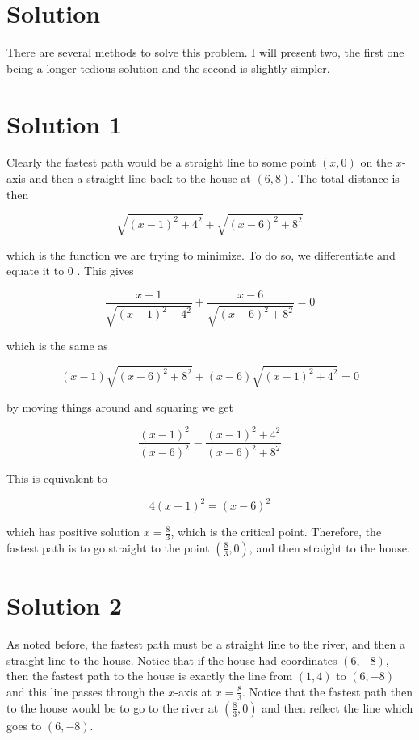 \documentclass[10pt]{article}
\begin{document}
\section*{Solution}
There are several methods to solve this problem. I will present two, the first one being a longer tedious solution and the second is slightly simpler.

\section*{Solution 1}
Clearly the fastest path would be a straight line to some point $(x, 0)$ on the $x$-axis and then a straight line back to the house at $(6,8)$. The total distance is then

$$
\sqrt{(x-1)^{2}+4^{2}}+\sqrt{(x-6)^{2}+8^{2}}
$$

which is the function we are trying to minimize. To do so, we differentiate and equate it to 0 . This gives

$$
\frac{x-1}{\sqrt{(x-1)^{2}+4^{2}}}+\frac{x-6}{\sqrt{(x-6)^{2}+8^{2}}}=0
$$

which is the same as

$$
(x-1) \sqrt{(x-6)^{2}+8^{2}}+(x-6) \sqrt{(x-1)^{2}+4^{2}}=0
$$

by moving things around and squaring we get

$$
\frac{(x-1)^{2}}{(x-6)^{2}}=\frac{(x-1)^{2}+4^{2}}{(x-6)^{2}+8^{2}}
$$

This is equivalent to

$$
4(x-1)^{2}=(x-6)^{2}
$$

which has positive solution $x=\frac{8}{3}$, which is the critical point. Therefore, the fastest path is to go straight to the point $\left(\frac{8}{3}, 0\right)$, and then straight to the house.

\section*{Solution 2}
As noted before, the fastest path must be a straight line to the river, and then a straight line to the house. Notice that if the house had coordinates $(6,-8)$, then the fastest path to the house is exactly the line from $(1,4)$ to $(6,-8)$ and this line passes through the $x$-axis at $x=\frac{8}{3}$. Notice that the fastest path then to the house would be to go to the river at $\left(\frac{8}{3}, 0\right)$ and then reflect the line which goes to $(6,-8)$.
\end{document}
